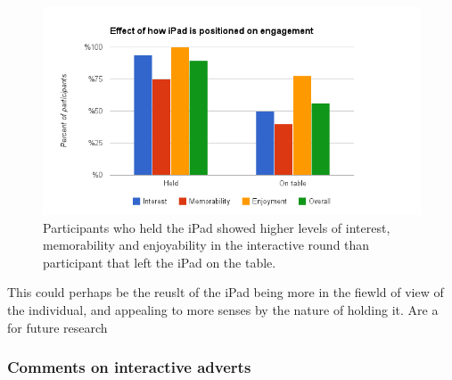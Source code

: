 	\begin{figure}[!h]
		\centering
		\includegraphics[width=\textwidth]{images/ipad_held.png}
		\caption{Participants who held the iPad showed higher levels of interest, memorability and enjoyability in the interactive round than participant that left the iPad on the table.}
		\label{fig:held}
	\end{figure}

	This could perhaps be the reuslt of the iPad being more in the fiewld of view of the individual, and appealing to more senses by the nature of holding it. Are a for future research
	

	\subsubsection{Comments on interactive adverts}
	